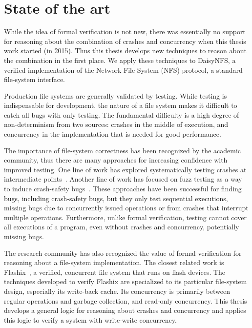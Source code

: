 \section{State of the art}
\label{sec:intro:related}

While the idea of formal verification is not new, there was essentially no
support for reasoning about the combination of crashes and concurrency when this
thesis work started (in 2015). Thus this thesis develops new techniques to
reason about the combination in the first place. We apply these techniques to
DaisyNFS, a verified implementation of the Network File System (NFS) protocol, a
standard file-system interface.

Production file systems are generally validated by testing. While testing is
indispensable for development, the nature of a file system makes it difficult to
catch all bugs with only testing. The fundamental difficulty is a high degree of
non-determinism from two sources: crashes in the middle of execution, and
concurrency in the implementation that is needed for good performance.

The importance of file-system correctness has been recognized by the academic
community, thus there are many approaches for increasing confidence with
improved testing. One line of work has explored systematically testing crashes
at intermediate points~\cite{mohan:crashmonkey,pillai:appcrash,yang:explode}. Another line of
work has focused on fuzz testing as a way to induce crash-safety
bugs~\cite{xu:janus,kim:hydra}. These approaches have been successful for
finding bugs, including crash-safety bugs, but they only test sequential
executions, missing bugs due to concurrently issued operations or from crashes
that interrupt multiple operations. Furthermore, unlike formal verification, testing cannot
cover all executions of a program, even without crashes and concurrency,
potentially missing bugs.

The research community has also recognized the value of formal verification for
reasoning about a file-system implementation. The closest related work is
Flashix~\cite{bodenmuller:concurrent-flashix}, a verified, concurrent file
system that runs on flash devices. The techniques
developed to verify Flashix are specialized to its particular file-system
design, especially its write-back cache. Its concurrency is primarily between
regular operations and garbage collection, and read-only concurrency. This
thesis develops a general logic for reasoning about crashes and concurrency and
applies this logic to verify a system with write-write concurrency.

